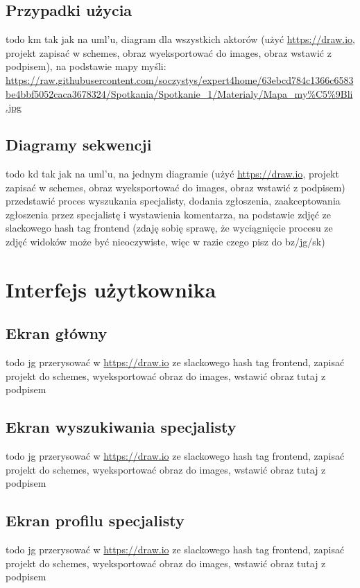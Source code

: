 \documentclass[10pt, titlepage, oneside, a4paper]{article}
\begin{document}
  \subsection{Przypadki użycia}
  todo km tak jak na uml'u, diagram dla wszystkich aktorów (użyć \url{https://draw.io}, projekt zapisać w schemes, obraz wyeksportować do images, obraz wstawić z podpisem), na podstawie mapy myśli: \url{https://raw.githubusercontent.com/soczystys/expert4home/63ebcd784c1366c6583be4bbf5052caca3678324/Spotkania/Spotkanie_1/Materialy/Mapa_my\%C5\%9Bli.jpg}
  
  \subsection{Diagramy sekwencji}
	todo kd tak jak na uml'u, na jednym diagramie (użyć \url{https://draw.io}, projekt zapisać w schemes, obraz wyeksportować do images, obraz wstawić z podpisem) przedstawić proces wyszukania specjalisty, dodania zgłoszenia, zaakceptowania zgłoszenia przez specjalistę i wystawienia komentarza, na podstawie zdjęć ze slackowego hash tag frontend (zdaję sobię sprawę, że wyciągnięcie procesu ze zdjęć widoków może być nieoczywiste, więc w razie czego pisz do bz/jg/sk)
  
	\section{Interfejs użytkownika}
  
	\subsection{Ekran główny}
	todo jg przerysować w \url{https://draw.io} ze slackowego hash tag frontend, zapisać projekt do schemes, wyeksportować obraz do images, wstawić obraz tutaj z podpisem
	
	\subsection{Ekran wyszukiwania specjalisty}
	todo jg przerysować w \url{https://draw.io} ze slackowego hash tag frontend, zapisać projekt do schemes, wyeksportować obraz do images, wstawić obraz tutaj z podpisem
	
	\subsection{Ekran profilu specjalisty}	
	todo jg przerysować w \url{https://draw.io} ze slackowego hash tag frontend, zapisać projekt do schemes, wyeksportować obraz do images, wstawić obraz tutaj z podpisem	
	
\end{document}
